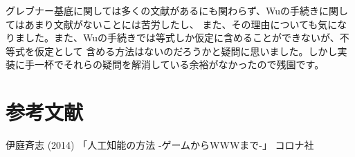 \documentclass[dvipdfmx]{jsarticle}
\begin{document}
    グレブナー基底に関しては多くの文献があるにも関わらず、Wuの手続きに関してはあまり文献がないことには苦労したし、
    また、その理由についても気になりました。また、Wuの手続きでは等式しか仮定に含めることができないが、不等式を仮定として
    含める方法はないのだろうかと疑問に思いました。しかし実装に手一杯でそれらの疑問を解消している余裕がなかったので残園です。
    \section{参考文献}
    伊庭斉志 (2014) 「人工知能の方法 -ゲームからWWWまで-」 コロナ社
\end{document}
